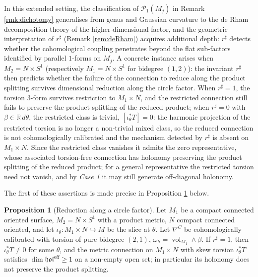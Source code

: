 \documentclass[11pt,reqno]{amsart}
\theoremstyle{plain}
\theoremstyle{definition}
\newtheorem{proposition}[theorem]{Proposition}
\numberwithin{equation}{section}
\begin{document}
In this extended setting, the classification of $\mathcal{P}_1(M_j)$ in Remark \ref{rmk:dichotomy} generalises from genus and Gaussian curvature to the de Rham decomposition theory of the higher-dimensional factor, and the geometric 
interpretation of $r^\sharp$ (Remark \ref{rem:deRham}) 
acquires additional depth: $r^\sharp$ detects whether the 
cohomological coupling penetrates beyond the flat sub-factors 
identified by parallel $1$-forms on $M_j$. A concrete instance arises when $M_2 = N \times S^1$ (respectively $M_1 = N \times S^1$ for bidegree $(1,2)$): the invariant $r^\sharp$ then predicts whether the failure of the connection to reduce along the product splitting survives dimensional reduction along the circle factor. 
When $r^\sharp = 1$, the torsion $3$-form survives restriction to $M_1 \times N$, and the restricted connection still fails to preserve the product splitting of the reduced product; when $r^{\sharp}=0$ with $\beta\in\mathbb{R}\,d\theta$, the restricted class is trivial, $[\iota_\theta^{*}T]=0$: the harmonic projection of the restricted torsion is no longer a non-trivial mixed class, so the reduced connection is not
cohomologically calibrated and the mechanism detected by $r^{\sharp}$ is absent on $M_1\times N$.  Since the restricted class vanishes it admits the zero representative, whose associated torsion-free connection has holonomy preserving
the product splitting of the reduced product; for a general representative the restricted torsion need not vanish, and by \emph{Case 1} it may still generate off-diagonal holonomy.

The first of these assertions is made precise in Proposition \ref{prop:reduction} below.

\begin{proposition}[Reduction along a circle factor]\label{prop:reduction}
Let $M_1$ be a compact connected oriented surface, $M_2=N\times S^1$ with a product metric, $N$ compact connected oriented, and let $\iota_\theta:M_1\times N\hookrightarrow M$ be the slice at $\theta$.  Let $\nabla^C$ be cohomologically calibrated with torsion of pure bidegree $(2,1)$,
$\omega_h=\operatorname{vol}_{M_1}\wedge\beta$.  If $r^{\sharp}=1$, then $\iota_\theta^{*}T\neq0$ for some $\theta$, and the metric connection on $M_1\times N$ with skew torsion $\iota_\theta^{*}T$ satisfies $\dim\mathfrak{hol}^{\mathrm{off}}\geq1$ on a non-empty open set; in particular its holonomy does not preserve the product splitting.
\end{proposition}
\end{document}
